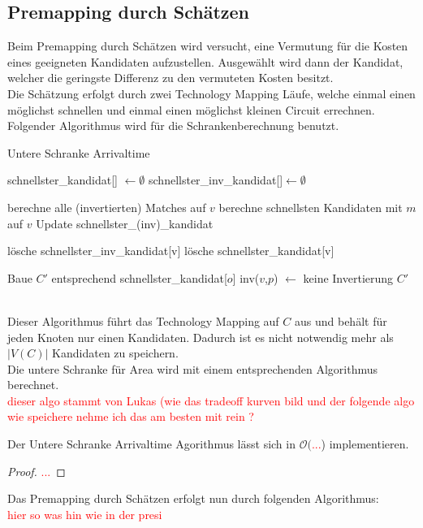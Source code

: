 \documentclass[11pt, a4paper, german]{article}
\newcommand{\TM}{Technology  Mapping }
\begin{document}
\subsection{Premapping durch Schätzen}
\label{subsec:premapping_duch_schaetzen}
 Beim Premapping durch Schätzen wird versucht, eine Vermutung für die Kosten eines geeigneten Kandidaten aufzustellen. Ausgewählt wird dann der Kandidat, welcher die geringste Differenz zu den vermuteten Kosten besitzt.\\
Die Schätzung erfolgt durch zwei \TM Läufe, welche einmal einen möglichst schnellen und einmal einen möglichst kleinen Circuit errechnen. Folgender Algorithmus wird für die Schrankenberechnung benutzt. 
\begin{algorithm}[H]
 \LinesNumbered
 \DontPrintSemicolon
 \caption{Untere Schranke Arrivaltime}

 schnellster\_kandidat[] $\gets \emptyset$\;
 schnellster\_inv\_kandidat[]$ \gets \emptyset$\;
 {
   berechne alle (invertierten) Matches auf $v$\;
   {
      berechne schnellsten Kandidaten mit $m$ auf $v$\;
      Update schnellster\_(inv)\_kandidat\;
   }
   {
      
      {
	l\"osche schnellster\_inv\_kandidat[v]\;
      }
      \Else
      {
	l\"osche schnellster\_kandidat[v]\;
      }
   }
 }
 Baue $C'$ entsprechend schnellster\_kandidat[$o$]\;
 {
    {
      {
	inv($v$,$p$) $\gets$ keine Invertierung\;
      }
    }
 }
 \Return $C'$\;
\end{algorithm}\ \\

 Dieser Algorithmus führt das \TM auf $C$ aus und behält für jeden Knoten nur einen Kandidaten. Dadurch ist es nicht notwendig mehr als $|V(C)|$ Kandidaten zu speichern. \\
 Die untere Schranke für Area wird mit einem entsprechenden Algorithmus berechnet. \\
 \textcolor{red}{dieser algo stammt von Lukas (wie das tradeoff kurven bild und der folgende algo wie speichere nehme ich das am besten mit rein ?}\\

\begin{cor}
Der Untere Schranke Arrivaltime Agorithmus lässt sich in $\mathcal{O}($\textcolor{red}{...}) implementieren.
\end{cor}
 \begin{proof}
 \textcolor{red}{...}
 \end{proof}
 Das Premapping durch Schätzen erfolgt nun durch folgenden Algorithmus:\\
 \textcolor{red}{hier so was hin wie in der presi}\\
 
\end{document}
